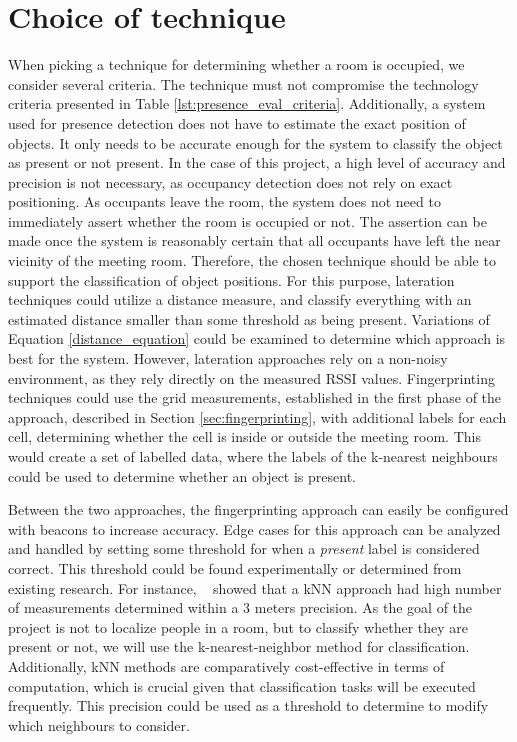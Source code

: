 \section{Choice of technique}\label{sec:ChoiceOfTechnique}
When picking a technique for determining whether a room is occupied, we consider several criteria.
The technique must not compromise the technology criteria presented in Table \ref{lst:presence_eval_criteria}.
Additionally, a system used for presence detection does not have to estimate the exact position of objects.
It only needs to be accurate enough for the system to classify the object as present or not present.
In the case of this project, a high level of accuracy and precision is not necessary, as occupancy detection does not rely on exact positioning.
As occupants leave the room, the system does not need to immediately assert whether the room is occupied or not.
The assertion can be made once the system is reasonably certain that all occupants have left the near vicinity of the meeting room.
Therefore, the chosen technique should be able to support the classification of object positions.  
For this purpose, lateration techniques could utilize a distance measure, and classify everything with an estimated distance smaller than some threshold as being present.
Variations of Equation \ref{distance_equation} could be examined to determine which approach is best for the system.
However, lateration approaches rely on a non-noisy environment, as they rely directly on the measured RSSI values.
Fingerprinting techniques could use the grid measurements, established in the first phase of the approach, described in Section \ref{sec:fingerprinting}, with additional labels for each cell, determining whether the cell is inside or outside the meeting room.
This would create a set of labelled data, where the labels of the k-nearest neighbours could be used to determine whether an object is present. 

Between the two approaches, the fingerprinting approach can easily be configured with beacons to increase accuracy.
Edge cases for this approach can be analyzed and handled by setting some threshold for when a \textit{present} label is considered correct. 
This threshold could be found experimentally or determined from existing research. 
For instance, \citeauthor{ble_kneares_neural}~\cite{ble_kneares_neural} showed that a kNN approach had high number of measurements determined within a 3 meters precision.
As the goal of the project is not to localize people in a room, but to classify whether they are present or not, we will use the k-nearest-neighbor method for classification.
Additionally, kNN methods are comparatively cost-effective in terms of computation, which is crucial given that classification tasks will be executed frequently.
This precision could be used as a threshold to determine to modify which neighbours to consider.    
